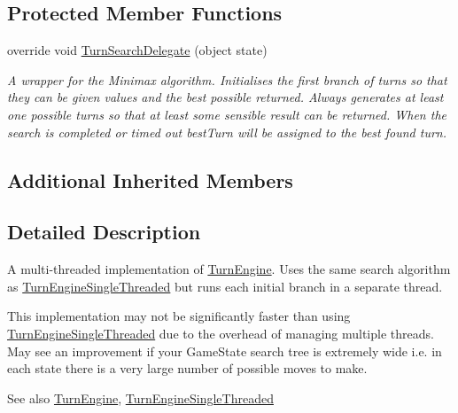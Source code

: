 \subsection*{Protected Member Functions}
\begin{DoxyCompactItemize}
\item 
override void \hyperlink{class_universal_turn_based_a_i_1_1_turn_engine_multi_threaded_a877d78f1b5b0f51ecf745bf5cf8fbb05}{Turn\+Search\+Delegate} (object state)
\begin{DoxyCompactList}\small\item\em A wrapper for the Minimax algorithm. Initialises the first branch of turns so that they can be given values and the best possible returned. Always generates at least one possible turns so that at least some sensible result can be returned. When the search is completed or timed out best\+Turn will be assigned to the best found turn. \end{DoxyCompactList}\end{DoxyCompactItemize}
\subsection*{Additional Inherited Members}


\subsection{Detailed Description}
A multi-\/threaded implementation of \hyperlink{class_universal_turn_based_a_i_1_1_turn_engine}{Turn\+Engine}. Uses the same search algorithm as \hyperlink{class_universal_turn_based_a_i_1_1_turn_engine_single_threaded}{Turn\+Engine\+Single\+Threaded} but runs each initial branch in a separate thread. 

This implementation may not be significantly faster than using \hyperlink{class_universal_turn_based_a_i_1_1_turn_engine_single_threaded}{Turn\+Engine\+Single\+Threaded} due to the overhead of managing multiple threads. May see an improvement if your Game\+State search tree is extremely wide i.\+e. in each state there is a very large number of possible moves to make.

\begin{DoxySeeAlso}{See also}
\hyperlink{class_universal_turn_based_a_i_1_1_turn_engine}{Turn\+Engine}, \hyperlink{class_universal_turn_based_a_i_1_1_turn_engine_single_threaded}{Turn\+Engine\+Single\+Threaded}


\end{DoxySeeAlso}


